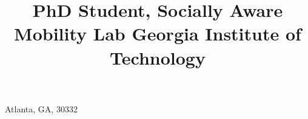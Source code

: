 

\title{\normalsize
	PhD Student, Socially Aware Mobility Lab \newline
	Georgia Institute of Technology
}

\address{755 Ferst Dr NW}{Atlanta, GA, 30332}



\newcommand{\see}[1]{\hfill{\itshape\color{see}\footnotesize{}see #1}}

\newcommand{\br}{\ifinner, \else\\\fi}

\newcommand{\github}[1]{\href{https://github.com/ctriley/#1}{#1}}

\makeatletter
\def\@bibitem#1{%
	\def\mykey{#1}%
	\item\if@filesw\immediate\write\@auxout {\string\bibcite{#1}%
	{\the\value{\@listctr}}}\fi\ignorespaces}



\makeatother

\newlength{\bibliographysectionspacing}            %
\setlength{\bibliographysectionspacing}{.15in}
\newcommand{\bibsectiontitleformat}[1]{#1}         %

